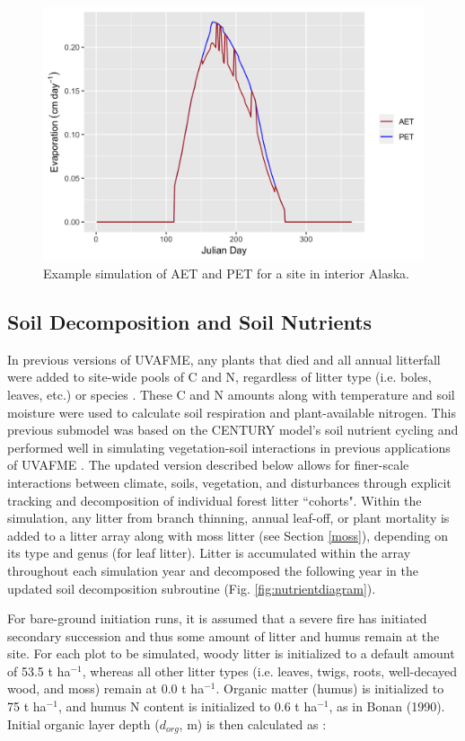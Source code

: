 \documentclass[a4paper, 12pt] {report}
\begin{document}
\begin{figure}
  \includegraphics[width=0.8\linewidth]{Figures/AET.png}
  \caption{Example simulation of AET and PET for a site in interior Alaska.}
  \label{fig:aet}
\end{figure}

\subsection{Soil Decomposition and Soil Nutrients} \label{nutrients}
In previous versions of UVAFME, any plants that died and all annual litterfall were added to site-wide pools of C and N, regardless of litter type (i.e. boles, leaves, etc.) or species \cite{fosterValidationApplicationForest2017, yanFAREASTForestGap2005}. These C and N amounts along with temperature and soil moisture were used to calculate soil respiration and plant-available nitrogen. This previous submodel was based on the CENTURY model's soil nutrient cycling  and performed well in simulating vegetation-soil interactions in previous applications of UVAFME \cite{yanFAREASTForestGap2005, shumanFireDisturbanceClimate2017, fosterValidationApplicationForest2017}. The updated version described below allows for finer-scale interactions between climate, soils, vegetation, and disturbances through explicit tracking and decomposition of individual forest litter ``cohorts". Within the simulation, any litter from branch thinning, annual leaf-off, or plant mortality is added to a litter array along with moss litter (see Section \ref{moss}), depending on its type and genus (for leaf litter). Litter is accumulated within the array throughout each simulation year and decomposed the following year in the updated soil decomposition subroutine (Fig. \ref{fig:nutrientdiagram}).

For bare-ground initiation runs, it is assumed that a severe fire has initiated secondary succession and thus some amount of litter and humus remain at the site. For each plot to be simulated, woody litter is initialized to a default amount of 53.5 t ha$^{-1}$, whereas all other litter types (i.e. leaves, twigs, roots, well-decayed wood, and moss) remain at 0.0 t ha$^{-1}$. Organic matter (humus) is initialized to 75 t ha$^{-1}$, and humus N content is initialized to 0.6 t ha$^{-1}$, as in Bonan (1990). Initial organic layer depth ($d_{org}$, m) is then calculated as :
\end{document}
